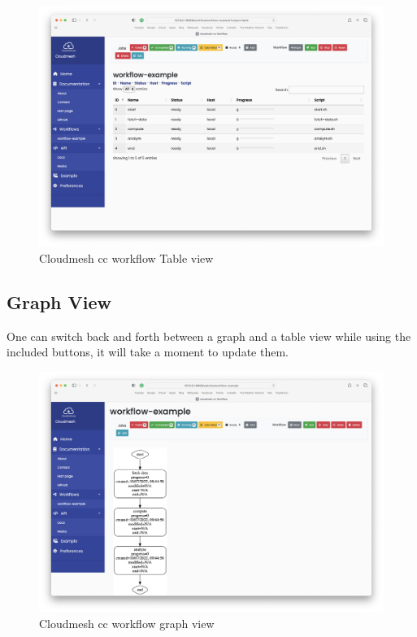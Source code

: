 \begin{figure}
\centering
\includegraphics{images/service-table.png}
\caption{Cloudmesh cc workflow Table view}
\end{figure}

\subsection{Graph View}\label{graph-view}

One can switch back and forth between a graph and a table view while
using the included buttons, it will take a moment to update them.

\begin{figure}
\centering
\includegraphics{images/service-graph.png}
\caption{Cloudmesh cc workflow graph view}
\end{figure}

